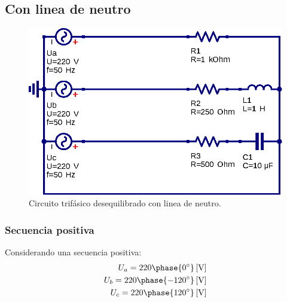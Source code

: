 \documentclass[letter,11pt]{article}
\begin{document}
\subsection{Con linea de neutro}
\begin{figure}[!h]
\centering
\includegraphics[scale=0.9]{figura2.eps}
\caption{Circuito trifásico desequilibrado con linea de neutro.}
\label{circuito2}
\end{figure}

\subsubsection{Secuencia positiva}
Considerando una secuencia positiva:
\begin{equation*}
    \begin{split}
        U_a = 220\phase{0^{\circ}}\,[\text{V}]\\
        U_b = 220\phase{-120^{\circ}}\,[\text{V}]\\
        U_c = 220\phase{120^{\circ}}\,[\text{V}]\\
    \end{split}
\end{equation*}
\end{document}
